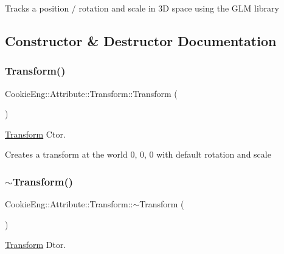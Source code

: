 Tracks a position / rotation and scale in 3D space using the G\+LM library 

\subsection{Constructor \& Destructor Documentation}
\mbox{\label{class_cookie_eng_1_1_attribute_1_1_transform_a5937c664923e53ba8168185b1765dcd4}} 
\subsubsection{\texorpdfstring{Transform()}{Transform()}}
{\footnotesize\ttfamily Cookie\+Eng\+::\+Attribute\+::\+Transform\+::\+Transform (\begin{DoxyParamCaption}{ }\end{DoxyParamCaption})}



\hyperlink{class_cookie_eng_1_1_attribute_1_1_transform}{Transform} Ctor. 

Creates a transform at the world 0, 0, 0 with default rotation and scale \mbox{\label{class_cookie_eng_1_1_attribute_1_1_transform_aecf1ff56f3c0b6e72931c0899b510ad5}} 
\subsubsection{\texorpdfstring{$\sim$\+Transform()}{~Transform()}}
{\footnotesize\ttfamily Cookie\+Eng\+::\+Attribute\+::\+Transform\+::$\sim$\+Transform (\begin{DoxyParamCaption}{ }\end{DoxyParamCaption})\hspace{0.3cm}{\ttfamily [inline]}}



\hyperlink{class_cookie_eng_1_1_attribute_1_1_transform}{Transform} Dtor. 


